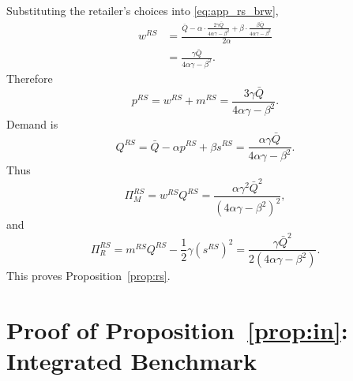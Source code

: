 Substituting the retailer's choices into \eqref{eq:app_rs_brw},
\begin{align}
 w^{RS}
 &=\frac{\bar Q-\alpha\cdot \frac{2\gamma\bar Q}{4\alpha\gamma-\beta^2}
 +\beta\cdot\frac{\beta\bar Q}{4\alpha\gamma-\beta^2}}{2\alpha} \\
 &=\frac{\gamma\bar Q}{4\alpha\gamma-\beta^2}.
\end{align}
Therefore
\begin{equation}
 p^{RS}=w^{RS}+m^{RS}=\frac{3\gamma\bar Q}{4\alpha\gamma-\beta^2}.
\end{equation}
Demand is
\begin{equation}
 Q^{RS}=\bar Q-\alpha p^{RS}+\beta s^{RS}
 =\frac{\alpha\gamma\bar Q}{4\alpha\gamma-\beta^2}.
\end{equation}
Thus
\begin{equation}
 \Pi_M^{RS}=w^{RS}Q^{RS}
 =\frac{\alpha\gamma^2\bar Q^2}{(4\alpha\gamma-\beta^2)^2},
\end{equation}
and
\begin{equation}
 \Pi_R^{RS}=m^{RS}Q^{RS}-\frac{1}{2}\gamma(s^{RS})^2
 =\frac{\gamma\bar Q^2}{2(4\alpha\gamma-\beta^2)}.
\end{equation}
This proves Proposition~\ref{prop:rs}.

\section{Proof of Proposition~\ref{prop:in}: Integrated Benchmark}
\label{app:proof_in}

